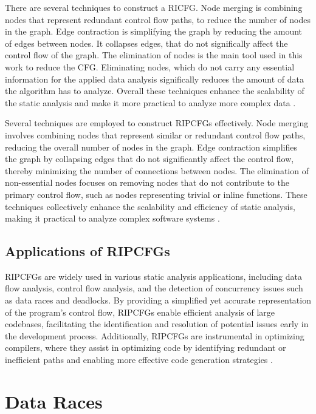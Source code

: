 \documentclass[
fancyheadings, %
%
%
]{stsreprt}
\begin{document}
{There are several techniques to construct a RICFG. Node merging is combining nodes that represent redundant control flow paths, to reduce the number of nodes in the graph. Edge contraction is simplifying the graph by reducing the amount of edges between nodes. It collapses edges, that do not significally affect the control flow of the graph. The elimination of nodes is the main tool used in this work to reduce the CFG. Eliminating nodes, which do not carry any essential information for the applied data analysis significally reduces the amount of data the algorithm has to analyze. Overall these techniques enhance the scalability of the static analysis and make it more practical to analyze more complex data \cite{muchnick1997}.

Several techniques are employed to construct RIPCFGs effectively. Node merging involves combining nodes that represent similar or redundant control flow paths, reducing the overall number of nodes in the graph. Edge contraction simplifies the graph by collapsing edges that do not significantly affect the control flow, thereby minimizing the number of connections between nodes. The elimination of non-essential nodes focuses on removing nodes that do not contribute to the primary control flow, such as nodes representing trivial or inline functions. These techniques collectively enhance the scalability and efficiency of static analysis, making it practical to analyze complex software systems \cite{muchnick1997}.

\subsection{Applications of RIPCFGs}

RIPCFGs are widely used in various static analysis applications, including data flow analysis, control flow analysis, and the detection of concurrency issues such as data races and deadlocks. By providing a simplified yet accurate representation of the program's control flow, RIPCFGs enable efficient analysis of large codebases, facilitating the identification and resolution of potential issues early in the development process. Additionally, RIPCFGs are instrumental in optimizing compilers, where they assist in optimizing code by identifying redundant or inefficient paths and enabling more effective code generation strategies \cite{muchnick1997}.

\section{Data Races}

}
\end{document}
